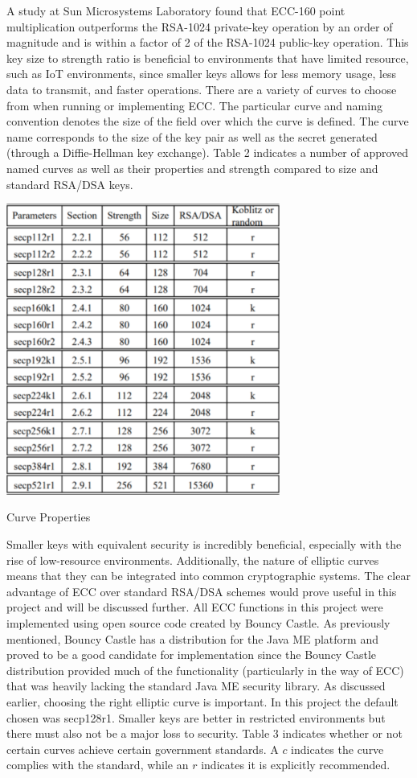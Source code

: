 A study at Sun Microsystems Laboratory found that ECC-160 point multiplication outperforms the RSA-1024 private-key operation by an order of magnitude and is within a factor of 2 of the RSA-1024 public-key operation. This key size to strength ratio is beneficial to environments that have limited resource, such as IoT environments,  since smaller keys allows for less memory usage, less data to transmit, and faster operations. There are a variety of curves to choose from when running or implementing ECC. The particular curve and naming convention denotes the size of the field over which the curve is defined. The curve name corresponds to the size of the key pair as well as the secret generated (through a Diffie-Hellman key exchange). Table 2 indicates a number of approved named curves as well as their properties and strength compared to size and standard RSA/DSA keys.

 
 \begin{table}[t]
	\centering
	\includegraphics[width=9cm,height=0.7\textheight,keepaspectratio]{./figures/table_2}
	\center\caption[font=footnote]{Curve Properties}
\end{table}

Smaller keys with equivalent security is incredibly beneficial, especially with the rise of low-resource environments. Additionally, the nature of elliptic curves means that they can be integrated into common cryptographic systems. The clear advantage of ECC over standard RSA/DSA schemes would prove useful in this project and will be discussed further. 
All ECC functions in this project were implemented using open source code created by Bouncy Castle. As previously mentioned, Bouncy Castle has a distribution for the Java ME platform and proved to be a good candidate for implementation since the Bouncy Castle distribution provided much of the functionality (particularly in the way of ECC) that was heavily lacking the standard Java ME security library. 
As discussed earlier, choosing the right elliptic curve is important. In this project the default chosen was secp128r1. Smaller keys are better in restricted environments but there must also not be a major loss to security. Table 3 indicates whether or not certain curves achieve certain government standards. A $c$ indicates the curve complies with the standard, while an $r$ indicates it is explicitly recommended.

